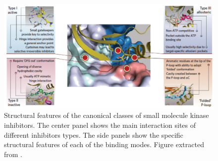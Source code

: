 \documentclass[11pt, b5paper,twoside]{tesi_upf}
\begin{document}
 
 
 
 
\begin{figure}[htbp]
	\includegraphics[width=1\linewidth]{../figures/type_kinases_inhibitors.pdf}
	\caption[Structural features of the canonical classes of small molecule kinase inhibitors]{Structural features of the canonical classes of small molecule kinase inhibitors. The center panel shows the main interaction sites of different inhibitors types. The side panels show the specific structural features of each of the binding modes. Figure extracted from \cite{Muller2015}.}
	\label{fig:type_inhibitors}
	\vspace*{4mm}
\end{figure}
   
\end{document}
